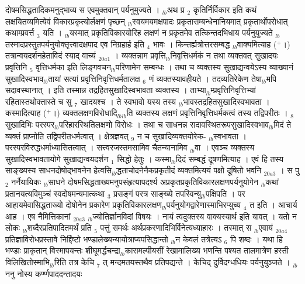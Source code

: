 \documentclass[article,12pt,a4paper]{memoir}%
\newcommand{\add}[1]{($^{+}$#1)}
\begin{document}
दोषमसिद्धतादिकमनुद्भाव्य स एवमुक्तवान् पर्यनुमुज्यते । {\tiny $_{lb}$}अथ प्र {\tiny $_{2}$} कृतिर्निर्विकार इति कथं लक्षयितव्यमित्येवं विकारप्रकृत्योर्लक्षणं पृच्छन् {\tiny $_{lb}$}स्वयमयमक्षपादः प्रकृतासम्बन्धेनानियमात् प्रकृतार्थोपरोधात् कथाम्प्रवर्त्त {\tiny $_{3}$} यति । {\tiny $_{lb}$}यस्मात् प्रकृतिविकारयोरिह लक्षणं न प्रकृतमेव तत्किन्तदभिधाय पर्यनुयुज्यते {\tiny $_{lb}$}तस्मादप्रस्तुतपर्यनुयोक्तृत्त्वादक्षपाद एव निग्रहार्ह इति {\tiny $_{4}$} भावः । किन्तर्ह्यत्रोत्तरसम्बद्ध {\tiny $_{lb}$}वाक्यमित्याह \add{।} तत्रान्वयदर्शनहेताविदं स्याद् वाच्यं {\tiny $_{20a1}$} । व्यक्तन्नाम प्रवृत्ति{\tiny $_{lb}$}निवृत्तिधर्मकं न तथा व्यक्तवत् सुखादयः प्रवृत्तिनि {\tiny $_{5}$} वृत्तिधर्मका इति लिङ्गवचन{\tiny $_{lb}$}परिणामेन सम्बन्धः । तथा च व्यक्तस्य सुखाद्यन्वयेऽस्य व्याख्यानं सुखादिस्वभाव{\tiny $_{lb}$}तायां सत्यां प्रवृत्तिनिवृत्तिधर्मतालक्ष {\tiny $_{6}$} णं व्यक्तस्यावहीयते । तदव्यतिरेकेण तेषा{\tiny $_{lb}$}मपि सदावस्थानात् । इति तस्मान्न तद्रहितसुखादिस्वभावता व्यक्तस्य । ताभ्या{\tiny $_{lb}$}म्प्रवृत्तिनिवृत्तिभ्यां रहितास्तथोक्तास्ते च सु {\tiny $_{7}$} खादयश्च । ते स्वभावो यस्य तस्य {\tiny $_{lb}$}भावस्तद्रहितसुखादिस्वभावता । कस्मादित्याह \add{।} व्यक्तलक्षणविरोधादि{\tiny $_{lb}$}{\tiny $_{lb}$}\leavevmode{}ति व्यक्तस्य लक्षणं प्रवृत्तिनिवृत्तिधर्मकत्वं तस्य तद्विपरीतः । {\tiny $_{8}$} सुखादिभिः परस्पर{\tiny $_{lb}$}परिहारस्थितिलक्षणो विरोधः । तथा च साधनन्न सदावस्थितरूपसुखादिस्वभाव{\tiny $_{lb}$}मिदं ते व्यक्तं प्राप्नोति तद्विपरीतधर्मत्वात् । क्षेत्रज्ञवत् {\tiny $_{9}$} \leavevmode{} न च सुखादिव्यक्तयोरेक- {\tiny $_{lb}$}स्वभावता । परस्परविरुद्धधर्माध्यासितत्वात् । सत्त्वरजस्तमसामिव चैतन्यानामिव {\tiny $_{lb}$}वा । एवञ्च व्यक्तस्य सुखादिस्वभावतायोगे सुखाद्यन्वयदर्शन {\tiny $_{1}$} सिद्धो हेतुः । कस्मा{\tiny $_{lb}$}दिदं सम्बद्धं दूषणमित्याह । {\color{DodgerBlue3}एवं हि तस्य साङ्ख्यस्य साधनदोषोद्भावनेन} हेत्वसि{\tiny $_{lb}$}द्धताचोदनेनैकप्रकृतीदं व्यक्तमित्ययं {\color{DodgerBlue3}पक्षो दूषितो भवनि} {\tiny $_{20a3}$} । स पु {\tiny $_{2}$} नर्नैयायिकः {\tiny $_{lb}$}साधने दोषमसिद्धताख्यमनुपसंहृत्यापदर्श्य अप्रकृतप्रकृतिविकारलक्षणपर्यनुयोगेन {\tiny $_{lb}$}कथां प्रतानयत्यविमुञ्चं स्वदोषमन्यमात्कथा {\tiny $_{3}$} प्रसङ्गं परत्र {\color{DodgerBlue3}साङ्ख्ये} तपस्विन्यु{\tiny $_{lb}$}पक्षिपति । पर आहायमेवासिद्धताख्यो दोषोनेन प्रकारेण प्रकृतिविकारलक्षण{\tiny $_{lb}$}पर्यनुयोगद्वारेणास्माभिरप्युच्य {\tiny $_{4}$} त इति । आचार्य आह । {\color{DodgerBlue3}एष नैमित्तिकानां} {\tiny $_{20a3}$} {\tiny $_{lb}$}ज्योतिर्ज्ञानविदां विषयः । नायं त्वदुक्तस्य वाक्यस्यार्थ इति यावत् । यतो न लोकः {\tiny $_{lb}$}शब्दैरप्रतिपादितमर्थं प्रति {\tiny $_{5}$} पत्तुं समर्थः अर्थप्रकरणादिभिर्विनेत्यध्याहारः । तस्मात् स {\tiny $_{lb}$}एवायं {\tiny $_{20a4}$} प्रतिज्ञाविरोधप्रस्तावे निर्द्दिष्टो {\color{DodgerBlue3}भण्डालेख्यन्यायोत्राप्यपसिद्धान्तो} {\tiny $_{lb}$}न केवलं तत्रेत्यऽ {\tiny $_{6}$} पि शब्दः । यथा हि {\color{DodgerBlue3}भण्डाः} प्राकृतान् विस्मापयन्तः शीघूमर्द्धचन्द्रा{\tiny $_{lb}$}कारामल्पीयसीं रेखामालिख्य भणन्ति पश्यत तालमात्रेण हस्ती विलिखितोस्माभि{\tiny $_{lb}$}रिति तत्र केचि {\tiny $_{7}$} त् मन्दमतयस्तथैव प्रतिपद्यन्ते । केचिद् दुर्विदग्धधियः पर्यनुयुञ्जते । {\tiny $_{lb}$}ननु नोस्य कर्ण्णपाददन्तादयः 
\end{document}
